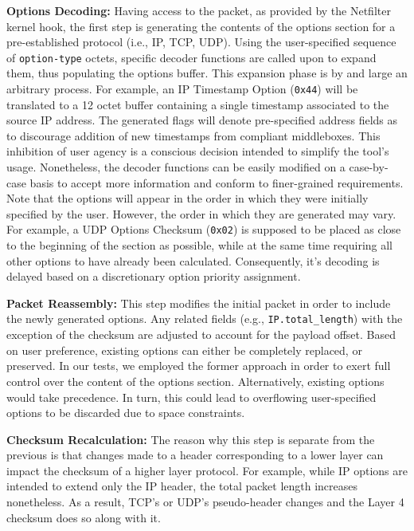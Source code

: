 \textbf{Options Decoding:} Having access to the packet, as provided by the Netfilter kernel hook, the first step is generating the contents of the options section for a pre-established protocol (i.e., IP, TCP, UDP). Using the user-specified sequence of \texttt{option-type} octets, specific decoder functions are called upon to expand them, thus populating the options buffer. This expansion phase is by and large an arbitrary process. For example, an IP Timestamp Option (\texttt{0x44}) will be translated to a 12 octet buffer containing a single timestamp associated to the source IP address. The generated flags will denote pre-specified address fields as to discourage addition of new timestamps from compliant middleboxes. This inhibition of user agency is a conscious decision intended to simplify the tool's usage. Nonetheless, the decoder functions can be easily modified on a case-by-case basis to accept more information and conform to finer-grained requirements. Note that the options will appear in the order in which they were initially specified by the user. However, the order in which they are generated may vary. For example, a UDP Options Checksum (\texttt{0x02}) is supposed to be placed as close to the beginning of the section as possible, while at the same time requiring all other options to have already been calculated. Consequently, it's decoding is delayed based on a discretionary option priority assignment.

\textbf{Packet Reassembly:} This step modifies the initial packet in order to include the newly generated options. Any related fields (e.g., \texttt{IP.total\_length}) with the exception of the checksum are adjusted to account for the payload offset. Based on user preference, existing options can either be completely replaced, or preserved. In our tests, we employed the former approach in order to exert full control over the content of the options section. Alternatively, existing options would take precedence. In turn, this could lead to overflowing user-specified options to be discarded due to space constraints.

\textbf{Checksum Recalculation:} The reason why this step is separate from the previous is that changes made to a header corresponding to a lower layer can impact the checksum of a higher layer protocol. For example, while IP options are intended to extend only the IP header, the total packet length increases nonetheless. As a result, TCP's or UDP's pseudo-header changes and the Layer 4 checksum does so along with it.

